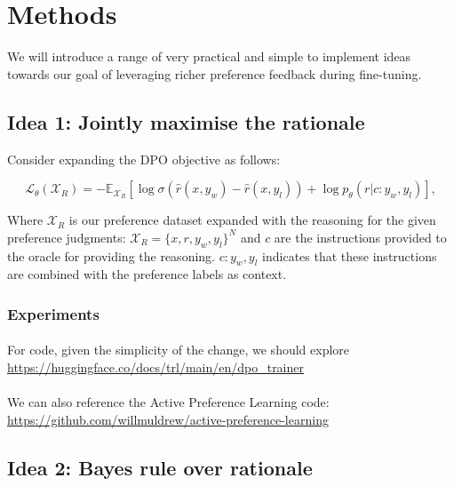 
\section{Methods}
We will introduce a range of very practical and simple to implement ideas towards our goal of leveraging richer preference feedback during fine-tuning.

\subsection{Idea 1: Jointly maximise the rationale }


Consider expanding the DPO objective as follows:

\begin{equation}
    \mathcal{L}_{\theta}(\mathcal{X}_{R}) = - \mathbb{E}_{\mathcal{X}_{R}}
    \left[ \log \sigma
    \left(
    \hat{r}(x, y_{w})
    - \hat{r}(x, y_{l})
    \right)
    + \log p_{\theta}(r | c :y_{w}, y_{l})
    \right],
    \label{eq:cdpo_loss}
\end{equation}

Where $\mathcal{X}_{R}$ is our preference dataset expanded with the reasoning for the given preference judgments: $\mathcal{X}_{R} = \{x, r, y_{w}, y_{l}\}^{N}$ and $c$ are the instructions provided to the oracle for providing the reasoning. $c :y_{w}, y_{l}$ indicates that these instructions are combined with the preference labels as context.

\subsubsection{Experiments}


\paragraph{}
For code, given the simplicity of the change, we should explore
\url{https://huggingface.co/docs/trl/main/en/dpo_trainer}

\paragraph{}
We can also reference the Active Preference Learning code:
\url{https://github.com/willmuldrew/active-preference-learning}



\subsection{Idea 2: Bayes rule over rationale}

